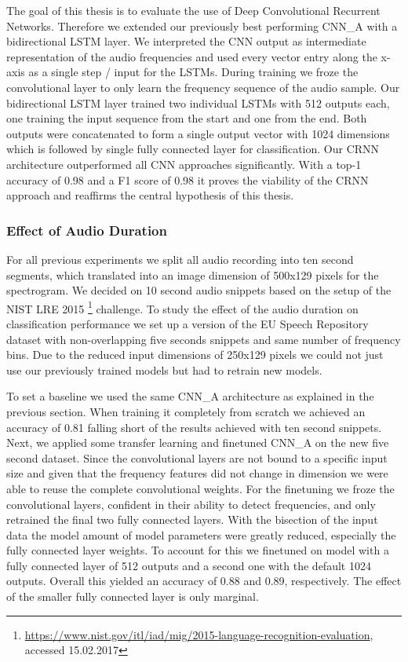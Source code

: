 The goal of this thesis is to evaluate the use of Deep Convolutional Recurrent Networks. Therefore we extended our previously best performing CNN\_A with a bidirectional LSTM layer. We interpreted the CNN output as intermediate representation of the audio frequencies and used every vector entry along the x-axis as a single step / input for the LSTMs. During training we froze the convolutional layer to only learn the frequency sequence of the audio sample. Our bidirectional LSTM layer trained two individual LSTMs with 512 outputs each, one training the input sequence from the start and one from the end. Both outputs were concatenated to form a single output vector with  1024 dimensions which is followed by single fully connected layer for classification.
Our CRNN architecture outperformed all CNN approaches significantly. With a top-1 accuracy of 0.98 and a F1 score of 0.98 it proves the viability of the CRNN approach and reaffirms the central hypothesis of this thesis.



\subsubsection{Effect of Audio Duration} 
\label{sec:duration}
For all previous experiments we split all audio recording into ten second segments, which translated into an image dimension of 500x129 pixels for the spectrogram. We decided on 10 second audio snippets based on the setup of the NIST LRE 2015 \footnote{\url{https://www.nist.gov/itl/iad/mig/2015-language-recognition-evaluation}, accessed 15.02.2017} challenge. To study the effect of the audio duration on classification performance we set up a version of the EU Speech Repository dataset with non-overlapping five seconds snippets and same number of frequency bins. Due to the reduced input dimensions of 250x129 pixels we could not just use our previously trained models but had to retrain new models.

To set a baseline we used the same CNN\_A architecture as explained in the previous section. When training it completely from scratch we achieved an accuracy of 0.81 falling short of the results achieved with ten second snippets. Next, we applied some transfer learning and finetuned CNN\_A on the new five second dataset. Since the convolutional layers are not bound to a specific input size and given that the frequency features did not change in dimension we were able to reuse the complete  convolutional weights. For the finetuning we froze the convolutional layers, confident in their ability to detect frequencies, and only retrained the final two fully connected layers. With the bisection of the input data the model amount of model parameters were greatly reduced, especially the fully connected layer weights. To account for this we finetuned on model with a fully connected layer of 512 outputs and a second one with the default 1024 outputs. Overall this yielded an accuracy of 0.88 and 0.89, respectively. The effect of the smaller fully connected layer is only marginal. 

